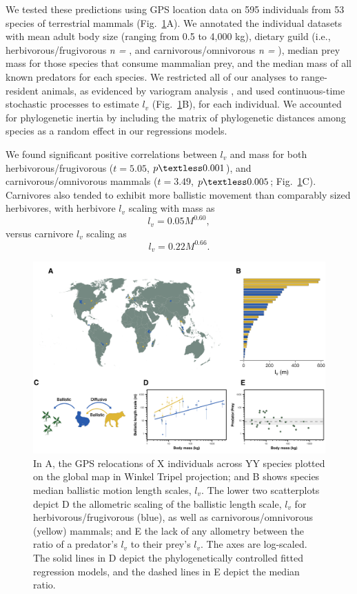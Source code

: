 \documentclass[12pt]{article}
\begin{document}
We tested these predictions using GPS location data on 595 individuals from 53 species of terrestrial mammals (Fig.~\ref{fig:emp_res}A). We annotated the individual datasets with mean adult body size (ranging from 0.5 to 4,000 kg), dietary guild (i.e., herbivorous/frugivorous {\it n = }, and carnivorous/omnivorous {\it n = }), median prey mass for those species that consume mammalian prey, and the median mass of all known predators for each species. We restricted all of our analyses to range-resident animals, as evidenced by variogram analysis \cite{Fleming:2014jr}, and used continuous-time stochastic processes to estimate $l_v$ (Fig.~\ref{fig:emp_res}B), for each individual. We accounted for phylogenetic inertia by including the matrix of phylogenetic distances among species as a random effect in our regressions models.

We found significant positive correlations between $l_v$ and mass for both herbivorous/frugivorous ($t = 5.05$, $p \textless 0.001$), and carnivorous/omnivorous mammals ($t = 3.49$, $p \textless 0.005$; Fig.~\ref{fig:emp_res}C). Carnivores also tended to exhibit more ballistic movement than comparably sized herbivores, with herbivore $l_v$ scaling with mass as
\begin{equation}
l_v = 0.05M^{0.60},
\end{equation}
versus carnivore $l_v$ scaling as
\begin{equation}
l_v = 0.22M^{0.66}.
\end{equation}


\begin{figure}[!h]
\centering
\includegraphics[scale=0.9]{Empirical_Figure.png}
\caption{In A, the GPS relocations of X individuals across YY species plotted on the global map in Winkel Tripel projection; and B shows species median ballistic motion length scales, $l_v$. The lower two scatterplots depict D the allometric scaling of the ballistic length scale, $l_v$ for herbivorous/frugivorous (blue), as well as carnivorous/omnivorous (yellow) mammals; and E the lack of any allometry between the ratio of a predator's $l_v$ to their prey's $l_v$. The axes are log-scaled. The solid lines in D depict the phylogenetically controlled fitted regression models, and the dashed lines in E depict the median ratio.}
\label{fig:emp_res}
\end{figure}
\end{document}
